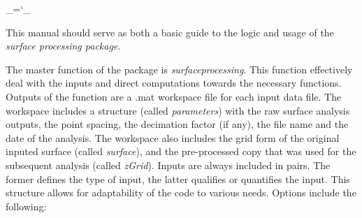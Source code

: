 \documentclass[12pt,a4paper]{article}
\begin{document}
\chardef\_=`_

This manual should serve as both a basic guide to the logic and usage of the \textit{surface processing package}. 

The master function of the package is \textit{surfaceprocessing}. This function effectively deal with the inputs and direct computations towards the necessary functions. Outputs of the function are a .mat workspace file for each input data file. The workspace includes a structure (called \textit{parameters}) with the raw surface analysis outputs, the point spacing, the decimation factor (if any), the file name and the date of the analysis. The workspace also includes the grid form of the original inputed surface (called \textit{surface}), and the pre-processed copy that was used for the subsequent analysis (called \textit{zGrid}).  Inputs are always included in pairs. The former defines the type of input, the latter qualifies or quantifies the input. This structure allows for adaptability of the code to various needs. Options include the following:
\end{document}
